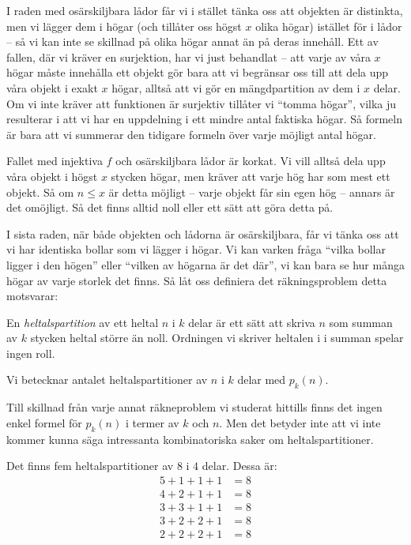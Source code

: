 \documentclass[nobib]{tufte-handout}
\begin{document}
I raden med osärskiljbara lådor får vi i stället tänka oss att objekten är distinkta, men vi lägger dem i högar (och tillåter oss högst $x$ olika högar) istället för i lådor -- så vi kan inte se skillnad på olika högar annat än på deras innehåll. Ett av fallen, där vi kräver en surjektion, har vi just behandlat -- att varje av våra $x$ högar måste innehålla ett objekt gör bara att vi begränsar oss till att dela upp våra objekt i exakt $x$ högar, alltså att vi gör en mängdpartition av dem i $x$ delar. Om vi inte kräver att funktionen är surjektiv tillåter vi ``tomma högar'', vilka ju resulterar i att vi har en uppdelning i ett mindre antal faktiska högar. Så formeln är bara att vi summerar den tidigare formeln över varje möjligt antal högar.

Fallet med injektiva $f$ och osärskiljbara lådor är korkat. Vi vill alltså dela upp våra objekt i högst $x$ stycken högar, men kräver att varje hög har som mest ett objekt. Så om $n \leq x$ är detta möjligt -- varje objekt får sin egen hög -- annars är det omöjligt. Så det finns alltid noll eller ett sätt att göra detta på.

I sista raden, när både objekten och lådorna är osärskiljbara, får vi tänka oss att vi har identiska bollar som vi lägger i högar. Vi kan varken fråga ``vilka bollar ligger i den högen'' eller ``vilken av högarna är det där'', vi kan bara se hur många högar av varje storlek det finns. Så låt oss definiera det räkningsproblem detta motsvarar:

\begin{definition}
  En \emph{heltalspartition} av ett heltal $n$ i $k$ delar är ett sätt att skriva $n$ som summan av $k$ stycken heltal större än noll. Ordningen vi skriver heltalen i i summan spelar ingen roll. 
  
  Vi betecknar antalet heltalspartitioner av $n$ i $k$ delar med $p_k(n)$.
\end{definition}

Till skillnad från varje annat räkneproblem vi studerat hittills finns det ingen enkel formel för $p_k(n)$ i termer av $k$ och $n$. Men det betyder inte att vi inte kommer kunna säga intressanta kombinatoriska saker om heltalspartitioner.


    
\begin{example}
  Det finns fem heltalspartitioner av $8$ i $4$ delar. Dessa är:
  \begin{align*}
    5 + 1 + 1 + 1 &= 8\\
    4 + 2 + 1 + 1 &= 8\\
    3 + 3 + 1 + 1 &= 8\\
    3 + 2 + 2 + 1 &= 8\\
    2 + 2 + 2 + 1 &= 8
  \end{align*}
\end{example}
\end{document}
